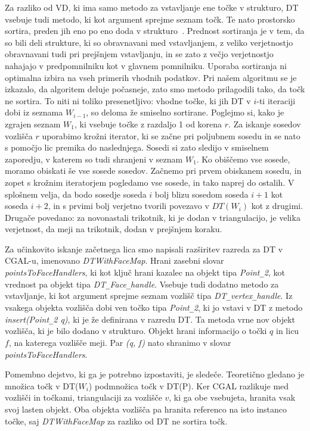 \documentclass[a4paper, 12pt]{book}
\newcommand{\U}{\texttt{\_}}
\begin{document}
Za razliko od VD, ki ima samo metodo za vstavljanje ene točke v strukturo, DT vsebuje tudi metodo, ki kot argument sprejme seznam točk. Te nato prostorsko sortira, preden jih eno po eno doda v strukturo~\cite{cgal:dd-ss-15a}. Prednost sortiranja je v tem, da so bili deli strukture, ki so obravnavani med vstavljanjem, z veliko verjetnostjo obravnavani tudi pri prejšnjem vstavljanju, in se zato z večjo verjetnostjo nahajajo v predpomnilniku kot v glavnem pomnilniku. Uporaba sortiranja ni optimalna izbira na vseh primerih vhodnih podatkov. Pri našem algoritmu se je izkazalo, da algoritem deluje počasneje, zato smo metodo prilagodili tako, da točk ne sortira. To niti ni toliko presenetljivo: vhodne točke, ki jih DT v $i$-ti iteraciji dobi iz seznama $W_{i-1}$, so deloma že smiselno sortirane. Poglejmo si, kako je zgrajen seznam $W_1$, ki vsebuje točke z razdaljo 1 od korena $r$. Za iskanje sosedov vozlišča $r$  uporabimo krožni iterator, ki se začne pri poljubnem sosedu in se nato s pomočjo lic premika do naslednjega. Sosedi si zato sledijo v smiselnem zaporedju, v katerem so tudi shranjeni v seznam $W_1$. Ko obiščemo vse sosede, moramo obiskati še vse sosede sosedov. Začnemo pri prvem obiskanem sosedu, in zopet s krožnim iteratorjem pogledamo vse sosede, in tako naprej do ostalih. V splošnem velja, da bodo sosedje soseda $i$ bolj blizu sosedom soseda $i+1$ kot soseda $i+2$, in s prvimi bolj verjetno tvorili povezavo v $DT(W_i)$ kot z drugimi. Drugače povedano: za novonastali trikotnik, ki je dodan v triangulacijo, je velika verjetnost, da meji na trikotnik, dodan v prejšnjem koraku.

\bigbreak

Za učinkovito iskanje začetnega lica smo napisali razširitev razreda za DT v CGAL-u, imenovano \textit{DTWithFaceMap}. Hrani zasebni slovar \textit{pointsToFaceHandlers}, ki kot ključ hrani kazalec na objekt tipa \textit{Point\U 2}, kot vrednost pa objekt tipa \textit{DT\U Face\U handle}. Vsebuje tudi dodatno metodo za vstavljanje, ki kot argument sprejme seznam vozlišč tipa \textit{DT\U vertex\U handle}. Iz vsakega objekta vozlišča dobi ven točko tipa \textit{Point\U 2}, ki jo vstavi v DT z metodo \textit{insert(Point\U 2 q)}, ki je že definirana  v razredu DT. Ta metoda vrne nov objekt vozlišča, ki je bilo dodano v strukturo. Objekt hrani informacijo o točki $q$ in licu $f$, na katerega vozlišče meji. Par \textit{(q, f)} nato shranimo v slovar \textit{pointsToFaceHandlers}.

Pomembno dejstvo, ki ga je potrebno izpostaviti, je sledeče. Teoretično gledano je množica točk v DT($W_i$) podmnožica točk v DT(P). Ker CGAL razlikuje med vozlišči in točkami, triangulaciji za vozlišče $v$, ki ga obe vsebujeta, hranita vsak svoj lasten objekt. Oba objekta vozlišča pa hranita referenco na isto instanco točke, saj \textit{DTWithFaceMap} za razliko od DT ne sortira točk.
\end{document}
